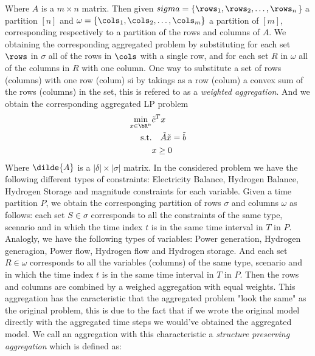 \documentclass[english]{article}
\numberwithin{definition}{section}
\numberwithin{theorem}{section}
\numberwithin{problem}{section}
\begin{document}
Where \(A\) is a \(m \times n\) matrix. Then given \(sigma = \{\rows_1, \rows_2, \ldots, \rows_n\)\} a partition \([n]\) and \(\omega = \{\cols_1, \cols_2, \ldots, \cols_m\}\) a partition of \([m]\), corresponding respectively to a partition of the rows and columns of \(A\).
We obtaining the corresponding aggregated problem by substituting for each set \(\rows\) in \(\sigma\) all of the rows in \(\cols\) with a single row, and for each set \(R\) in \(\omega\) all of the columns in \(R\) with one column.
One way to substitute a set of rows (columns) with one row (colum) si by takings as a row (colum) a convex sum of the rows (columns) in the set, this is refered to as a \emph{weighted aggregation}.
And we obtain the corresponding aggregated LP problem 
\begin{align} \min_{x \in \bR^{n}} &\tilde{c}^T x \\ \text{s.t.} &\quad \tilde{A} \tilde{x} = \tilde{b} \\ &x \geq 0 \end{align}
Where \(\dilde{A}\) is a \(|\delta| \times |\sigma|\) matrix.
In the considered problem we have the following different types of constraints: Electricity Balance, Hydrogen Balance, Hydrogen Storage and magnitude constraints for each variable.
Given a time partition \(P\), we obtain the corresponging partition of rows \(\sigma\) and columns \(\omega\) as follows: each set \(S \in \sigma\) corresponds to all the constraints of the same type, scenario and in which the time index \(t\) is in the same time interval in \(T\) in \(P\).
Analogly, we have the following types of variables: Power generation, Hydrogen generagion, Power flow, Hydrogen flow and Hydrogen storage. And each set \(R \in \omega\) corresponds to all the variables (columns) of the same type, scenario and in which the time index \(t\) is in the same time interval in \(T\) in \(P\).
Then the rows and columns are combined by a weighed aggregation with equal weights. This aggregation has the caracteristic that the aggregated problem "look the same" as the original problem, this is due to the fact that if we wrote the original model directly with the aggregated time steps we would've obtained the aggregated model.
We call an aggregation with this characteristic a \emph{structure preserving aggregation} which is defined as:
\end{document}
